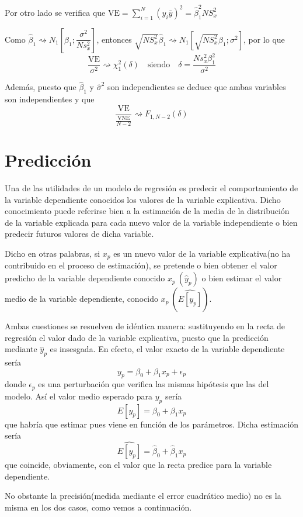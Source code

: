 \documentclass[10pt,a4paper]{book}
\begin{document}
Por otro lado se verifica que $\mathrm{VE}=\displaystyle\sum^N_{i=1}(\widehat{y}_i\bar{y})^2=\widehat{\beta}^2_1NS^2_x$

Como $\widehat{\beta}_1\rightsquigarrow N_1\left[\beta_1;\dfrac{\sigma^2}{Ns^2_x}\right]$, entonces $\sqrt{NS^2_x}\widehat{\beta}_1\rightsquigarrow N_1\left[\sqrt{NS^2_x}\beta_1;\sigma^2\right]$, por lo que $$\dfrac{\mathrm{VE}}{\sigma^2}\rightsquigarrow \chi^2_1(\delta)\quad \mathrm{siendo}\quad \delta=\dfrac{Ns^2_x\beta^2_1}{\sigma^2}$$

Además, puesto que $\widehat{\beta}_1$ y $\widehat{\sigma}^2$ son independientes se deduce que ambas variables son independientes y que $$\dfrac{\mathrm{VE}}{\frac{\mathrm{VNE}}{N-2}}\rightsquigarrow F_{1,N-2}(\delta)$$
	\section{Predicción}
Una de las utilidades de un modelo de regresión es predecir el comportamiento de la variable dependiente conocidos los valores de la variable explicativa. Dicho conocimiento puede referirse bien a la estimación de la media de la distribución de la variable explicada para cada nuevo valor de la variable independiente o bien predecir futuros valores de dicha variable.

Dicho en otras palabras, si $x_p$ es un nuevo valor de la variable explicativa(no ha contribuido en el proceso de estimación), se pretende o bien obtener el valor predicho de la variable dependiente conocido $x_p\ (\widehat{y}_p)$ o bien estimar el valor medio de la variable dependiente, conocido $x_p\ (\widehat{E[y_p]})$.

Ambas cuestiones se resuelven de idéntica manera: sustituyendo en la recta de regresión el valor dado de la variable explicativa, puesto que la predicción mediante $\widehat{y}_p$ es insesgada. En efecto, el valor exacto de la variable dependiente sería $$y_p=\beta_0+\beta_1x_p+\epsilon_p$$ donde $\epsilon_p$ es una perturbación que verifica las mismas hipótesis que las del modelo. Así el valor medio esperado para $y_p$ sería $$E[y_p]=\beta_0+\beta_1x_p$$ que habría que estimar pues viene en función de los parámetros. Dicha estimación sería $$\widehat{E[y_p]}=\widehat{\beta}_0+\widehat{\beta}_1x_p$$ que coincide, obviamente, con el valor que la recta predice para la variable dependiente.

No obstante la precisión(medida mediante el error cuadrático medio) no es la misma en los dos casos, como vemos a continuación.
\end{document}
